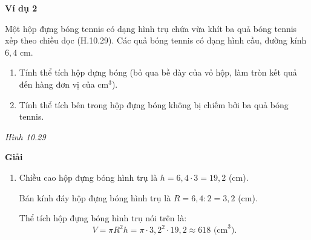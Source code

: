 \begin{exercises}
    \textbf{Ví dụ 2}

    Một hộp đựng bóng tennis có dạng hình trụ chứa vừa khít ba quả bóng tennis xếp theo chiều dọc (H.10.29). Các quả bóng tennis có dạng hình cầu, đường kính $6{,}4$ cm.
    \begin{enumerate}[label=\alph*)]
        \item Tính thể tích hộp đựng bóng (bỏ qua bề dày của vỏ hộp, làm tròn kết quả đến hàng đơn vị của cm$^3$).
        \item Tính thể tích bên trong hộp đựng bóng không bị chiếm bởi ba quả bóng tennis.
    \end{enumerate}

    \begin{center}

        \textit{Hình 10.29}
    \end{center}

    \textbf{Giải}

    \begin{enumerate}[label=\alph*)]
        \item Chiều cao hộp đựng bóng hình trụ là $h=6{,}4\cdot 3=19{,}2$ (cm).

        Bán kính đáy hộp đựng bóng hình trụ là $R=6{,}4:2=3{,}2$ (cm).

        Thể tích hộp đựng bóng hình trụ nói trên là:
        \[
            V=\pi R^2h=\pi\cdot 3{,}2^2\cdot 19{,}2\approx 618\text{ (cm}^3\text{)}.
        \]


\end{enumerate}
\end{exercises}
